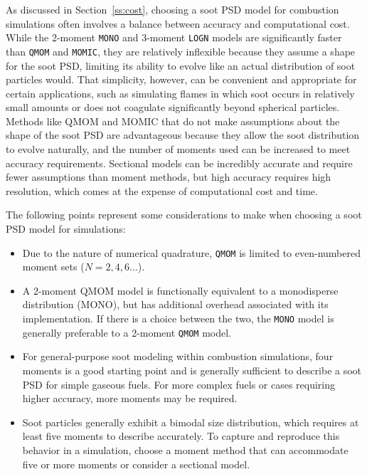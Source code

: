 \documentclass[preprint,letterpaper]{elsarticle}
\begin{document}
As discussed in Section~\ref{ss:cost}, choosing a soot PSD model for combustion simulations often involves a balance between accuracy and computational cost. While the 2-moment \texttt{MONO} and 3-moment \texttt{LOGN} models are significantly faster than \texttt{QMOM} and \texttt{MOMIC}, they are relatively inflexible because they assume a shape for the soot PSD, limiting its ability to evolve like an actual distribution of soot particles would. That simplicity, however, can be convenient and appropriate for certain applications, such as simulating flames in which soot occurs in relatively small amounts or does not coagulate significantly beyond spherical particles. Methods like QMOM and MOMIC that do not make assumptions about the shape of the soot PSD are advantageous because they allow the soot distribution to evolve naturally, and the number of moments used can be increased to meet accuracy requirements. Sectional models can be incredibly accurate and require fewer assumptions than moment methods, but high accuracy requires high resolution, which comes at the expense of computational cost and time.

The following points represent some considerations to make when choosing a soot PSD model for simulations:
\begin{itemize}
    \item Due to the nature of numerical quadrature, \texttt{QMOM} is limited to even-numbered moment sets ($N=2,4,6\ldots$).
    \item A 2-moment QMOM model is functionally equivalent to a monodisperse distribution (MONO), but has additional overhead associated with its implementation. If there is a choice between the two, the \texttt{MONO} model is generally preferable to a 2-moment \texttt{QMOM} model.
    \item For general-purpose soot modeling within combustion simulations, four moments is a good starting point and is generally sufficient to describe a soot PSD for simple gaseous fuels. For more complex fuels or cases requiring higher accuracy, more moments may be required.
    \item Soot particles generally exhibit a bimodal size distribution, which requires at least five moments to describe accurately. To capture and reproduce this behavior in a simulation, choose a moment method that can accommodate five or more moments or consider a sectional model.
\end{itemize}
\end{document}
